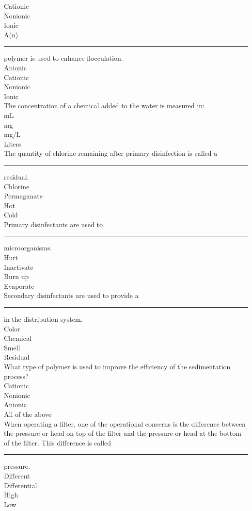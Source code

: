 Cationic\\
Nonionic\\
Ionic\\
A(n) \rule{1cm}{0.5pt}  polymer is used to enhance flocculation.\\
Anionic\\
Cationic\\
Nonionic\\
Ionic\\
The concentration of a chemical added to the water is measured in:\\
mL\\
mg\\
mg/L\\
Liters\\
The quantity of chlorine remaining after primary disinfection is called a\\
\rule{1cm}{0.5pt}  residual.\\
Chlorine\\
Permaganate\\
Hot\\
Cold\\
Primary disinfectants are used to \rule{1cm}{0.5pt}  microorganisms.\\
Hurt\\
Inactivate\\
Burn up\\
Evaporate\\
Secondary disinfectants are used to provide a \rule{1cm}{0.5pt}  in the distribution system.\\
Color\\
Chemical\\
Smell\\
Residual\\
What type of polymer is used to improve the efficiency of the sedimentation\\
process?\\
Cationic\\
Nonionic\\
Anionic\\
All of the above\\
When operating a filter, one of the operational concerns is the difference between the pressure or head on top of the filter and the pressure or head at the bottom of the filter. This difference is called \rule{1cm}{0.5pt}  pressure.\\
Different\\
Differential\\
High\\
Low\\
